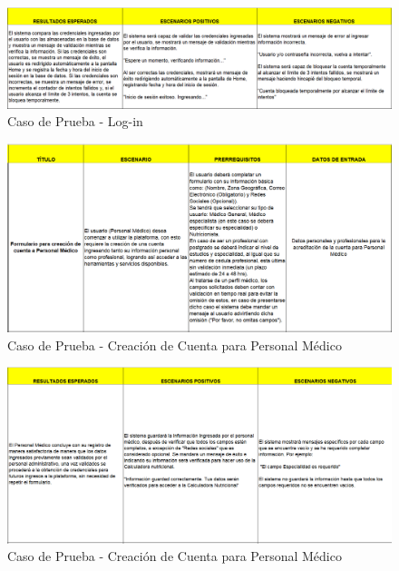 \documentclass[12pt,letterpaper,spanish, xcolor=table]{report}
\numberwithin{figure}{subsection}
\begin{document}
	\begin{figure}[H]
		\centering
		\includegraphics[width=1.0\textwidth]
		{Imagenes/CalculadoraNutricional/CPLogin2.png}
		\caption{Caso de Prueba - Log-in
		}\label{a2}
	\end{figure}
	
	\begin{figure}[H]
		\centering
		\includegraphics[width=1.0\textwidth]
		{Imagenes/CalculadoraNutricional/CPCuentaMedico.png}
		\caption{Caso de Prueba - Creación de Cuenta para Personal Médico
		}\label{a2}
	\end{figure}
	
	\begin{figure}[H]
		\centering
		\includegraphics[width=1.0\textwidth]
		{Imagenes/CalculadoraNutricional/CPCuentaMedico2.png}
		\caption{Caso de Prueba - Creación de Cuenta para Personal Médico
		}\label{a2}
	\end{figure}
	
\end{document}
